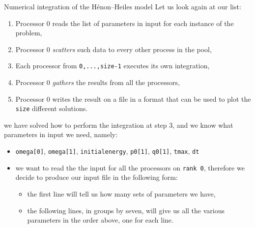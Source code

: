 \documentclass[xcolor={svgnames,usenames}]{beamer}
\begin{document}
\begin{frame}[fragile]{Numerical integration of the H\'enon--Heiles model}
Let us look again at our list:
\begin{enumerate}
	\item Processor 0 reads the list of parameters in input for each instance of the problem,
	\item Processor 0 \emph{scatters} such data to every other process in the pool,
	\item Each processor from \texttt{0,...,size-1} executes its own integration,
	\item Processor 0 \emph{gathers} the results from all the processors,
	\item Processor 0 writes the result on a file in a format that can be used to plot the \texttt{size} different solutions.  
\end{enumerate}
we have solved how to perform the integration at step 3, and we know what parameters in input we need, namely:
\begin{itemize}
	\item \texttt{omega[0]}, \texttt{omega[1]}, \texttt{initialenergy}, \texttt{p0[1]}, \texttt{q0[1]}, \texttt{tmax}, \texttt{dt}
	\item we want to read the the input for all the processors on \texttt{rank 0}, therefore we decide to produce our input file in the following form:
	\begin{itemize}
		\item the first line will tell us how many sets of parameters we have,
		\item the following lines, in groups by seven, will give us all the various parameters in the order above, one for each line.
	\end{itemize}
\end{itemize}
\end{frame}
\end{document}
